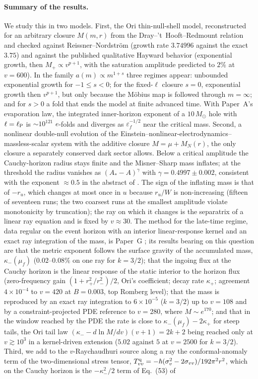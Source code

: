 \documentclass[11pt]{article}
\begin{document}
\paragraph{Summary of the results.} We study this in two models. First, the Ori thin-null-shell model, reconstructed for an arbitrary closure $M(m,r)$ from the Dray--'t~Hooft--Redmount relation and checked against Reissner--Nordstr\"om (growth rate $3.74996$ against the exact $3.75$) and against the published qualitative Hayward behavior (exponential growth, then $M_+\propto v^{p+1}$, with the saturation amplitude predicted to $2\%$ at $v=600$). In the family $a(m)\propto m^{1+s}$ three regimes appear: unbounded exponential growth for $-1\le s<0$; for the fixed-$\ell$ closure $s=0$, exponential growth then $v^{p+1}$, but only because the M\"obius map is followed through $m=\infty$; and for $s>0$ a fold that ends the model at finite advanced time. With Paper~A's evaporation law, the integrated inner-horizon exponent of a $10\,M_\odot$ hole with $\ell=\ell_{\rm P}$ is $\sim10^{121}$ $e$-folds and diverges as $\varepsilon_f^{-1/2}$ near the critical mass. Second, a nonlinear double-null evolution of the Einstein--nonlinear-electrodynamics--massless-scalar system with the additive closure $M=\mu+M_N(r)$, the only closure a separately conserved dark sector allows. Below a critical amplitude the Cauchy-horizon radius stays finite and the Misner--Sharp mass inflates; at the threshold the radius vanishes as $(A_*-A)^{\gamma}$ with $\gamma=0.4997\pm0.002$, consistent with the exponent $\approx0.5$ in the abstract of \citet{ShaoEtAl2025}. The sign of the inflating mass is that of $-r_u$, which changes at most once in $u$ because $r_u/W$ is non-increasing (fifteen of seventeen runs; the two coarsest runs at the smallest amplitude violate monotonicity by truncation); the ray on which it changes is the separatrix of a linear ray equation and is fixed by $v\approx30$. The method for the late-time regime, data regular on the event horizon with an interior linear-response kernel and an exact ray integration of the mass, is Paper~G \citep{PaperG}; its results bearing on this question are that the metric exponent follows the surface gravity of the accumulated mass, $\kappa_-(\mu_f)$ ($0.02$--$0.08\%$ on one ray for $k=3/2$); that the ingoing flux at the Cauchy horizon is the linear response of the static interior to the horizon flux (zero-frequency gain $(1+r_+^2/r_-^2)/2$, Ori's coefficient; decay rate $\kappa_+$; agreement $4\times10^{-4}$ to $v=420$ at $B=0.003$, top Romberg level); that the mass is reproduced by an exact ray integration to $6\times10^{-5}$ ($k=3/2$) up to $v=108$ and by a constraint-projected PDE reference to $v=280$, where $M\sim e^{170}$; and that in the window reached by the PDE the rate is close to $\kappa_-(\mu_f)-2\kappa_+$ for steep tails, the Ori tail law $(\kappa_--d\ln M/dv)(v+1)=2k+2$ being reached only at $v\gtrsim10^{3}$ in a kernel-driven extension ($5.02$ against $5$ at $v=2500$ for $k=3/2$). Third, we add to the $v$-Raychaudhuri source along a ray the conformal-anomaly term of the two-dimensional stress tensor, $T^{\rm q}_{vv}=-\hbar(\sigma_v^2-2\sigma_{vv})/192\pi^2r^2$, which on the Cauchy horizon is the $-\kappa_-^2/2$ term of Eq.~(53) of 
\end{document}
